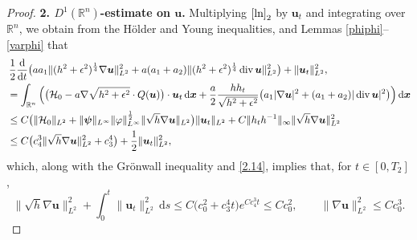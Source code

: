 \documentclass[11pt,reqno]{amsart}
\DeclareMathOperator{\diver}{\mathrm{div}}
\numberwithin{rk}{section}
\numberwithin{prop}{section}
\numberwithin{mydef}{section}
\numberwithin{lem}{section}
\numberwithin{equation}{section}
\numberwithin{thm}{section}
\begin{document}
\begin{proof}
\smallskip
\textbf{2. $D^1(\mathbb{R}^n)$-estimate on $\boldsymbol{u}$.} Multiplying $\eqref{ln}_2$ by $\boldsymbol{u}_t$ and  integrating over $\mathbb{R}^n$, we obtain from the H\"older and Young inequalities, and Lemmas \ref{phiphi}--\ref{varphi} that
\begin{equation}
\begin{aligned}
&\,\frac{1}{2}\frac{\mathrm{d}}{\mathrm{d}t}\big(aa_1\|(h^2+\epsilon^2)^{\frac{1}{4}}\nabla \boldsymbol{u}\|^2_{L^2}+a(a_1+a_2)\|(h^2+\epsilon^2)^{\frac{1}{4}}\diver \boldsymbol{u}\|^2_{L^2}\big)+\|\boldsymbol{u}_t\|^2_{L^2},\notag\\
& =\int_{\mathbb{R}^n}\Big( \big(\mathcal{H}_0-a\nabla\sqrt{h^2+\epsilon^2}\cdot Q(\boldsymbol{u})
\big)\cdot \boldsymbol{u}_t\,\mathrm{d}\boldsymbol{x} +\frac{a}{2}\frac{ hh_t}{\sqrt{h^2+\epsilon^2}}\big(a_1|\nabla \boldsymbol{u}|^2+(a_1+a_2)|\diver\boldsymbol{u}|^2\big)\Big)\,\mathrm{d}\boldsymbol{x}\notag\\
&\leq C\big(\|\mathcal{H}_0\|_{L^2}+\|\boldsymbol{\psi}\|_{L^\infty}\|\varphi\|^{\frac{1}{2}}_{L^\infty}\|\sqrt{h}\nabla \boldsymbol{u}\|_{L^2}\big)\|\boldsymbol{u}_t\|_{L^2} +C\|h_t h^{-1}\|_\infty\|\sqrt{h}\nabla \boldsymbol{u}\|^2_{L^2}\notag\\
&\leq C\big(c_4^3\|\sqrt{h}\nabla \boldsymbol{u}\|_{L^2}^2+c_3^4\big)+\frac{1}{2}\|\boldsymbol{u}_t\|^2_{L^2},\notag
\end{aligned}
\end{equation}
which, along with the Gr\"onwall inequality and \eqref{2.14}, implies that, for $t\in [0,T_2]$,
\begin{equation}\label{2.61f}
\|\sqrt{h}\nabla \boldsymbol{u}\|^2_{L^2}+\int^t_0\|\boldsymbol{u}_t\|^2_{L^2}\,\mathrm{d}s
\leq C\big(c^2_0+c_3^4t\big)e^{ Cc_4^3t}\leq  Cc^2_0,\qquad \|\nabla \boldsymbol{u}\|^2_{L^2}\leq Cc^3_0.
\end{equation}


\end{proof}
\end{document}
